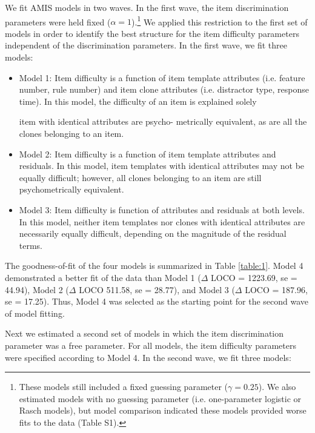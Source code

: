 \documentclass[a4paper,man,natbib]{apa6}
\begin{document}
We fit AMIS models in two waves. In the first wave, the item discrimination parameters were held fixed ($\alpha = 1$).\footnote{These models still included a fixed guessing parameter ($\gamma = 0.25$). We also estimated models with no guessing parameter (i.e. one-parameter logistic or Rasch models), but model comparison indicated these models provided worse fits to the data (Table S1).} We applied this restriction to the first set of models in order to identify the best structure for the item difficulty parameters independent of the discrimination parameters. In the first wave, we fit three models:

\begin{itemize}

\item Model 1: Item difficulty is a function of item template attributes (i.e. feature number, rule number) and item clone attributes (i.e. distractor type, response time). In this model, the difficulty of an item is explained solely 

item with identical attributes are psycho- metrically equivalent, as are all the clones belonging to an item.

\item Model 2: Item difficulty is a function of item template attributes and residuals. In this model, item templates with identical attributes may not be equally difficult; however, all clones belonging to an item are still psychometrically equivalent.

\item Model 3: Item difficulty is function of attributes and residuals at both levels. In this model, neither item templates nor clones with identical attributes are necessarily equally difficult, depending on the magnitude of the residual terms.

\end{itemize}

The goodness-of-fit of the four models is summarized in Table \ref{table:1}. Model 4 demonstrated a better fit of the data than Model 1 ($\Delta$ LOCO = 1223.69, se = 44.94), Model 2 ($\Delta$ LOCO 511.58, se = 28.77), and Model 3 ($\Delta$ LOCO = 187.96, se = 17.25). Thus, Model 4 was selected as the starting point for the second wave of model fitting.

Next we estimated a second set of models in which the item discrimination parameter was a free parameter. For all models, the item difficulty parameters were specified according to Model 4. In the second wave, we fit three models:
\end{document}
